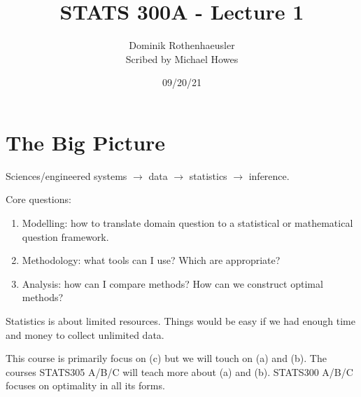 



\title{STATS 300A - Lecture 1}
\author{Dominik Rothenhaeusler\\ Scribed by Michael Howes}
\date{09/20/21}

\pagestyle{fancy}
\fancyhf{}


\maketitle
\tableofcontents
\section{The Big Picture}
Sciences/engineered systems $\to$ data $\to$ statistics $\to$ inference.

Core questions:
\begin{enumerate}
    \item Modelling: how to translate domain question to a statistical or mathematical question framework.
    \item Methodology: what tools can I use? Which are appropriate?
    \item Analysis: how can I compare methods? How can we construct optimal methods?
\end{enumerate}
Statistics is about limited resources. Things would be easy if we had enough time and money to collect unlimited data.

This course is primarily focus on (c) but we will touch on (a) and (b). The courses STATS305 A/B/C will teach more about (a) and (b). STATS300 A/B/C focuses on optimality in all its forms.

